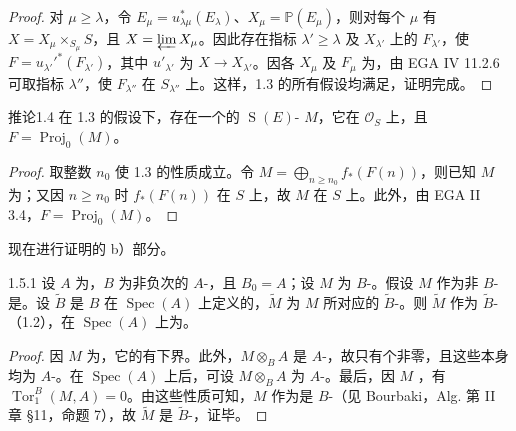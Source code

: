 \begin{proof}
对 $\mu\geq\lambda$，令 $E_\mu=u_{\lambda\mu}^*(E_\lambda)$、$X_\mu=\mathbb P(E_\mu)$，则对每个 $\mu$ 有 $X=X_\mu\times_{S_\mu}S$，且 $X=\varprojlim X_\mu$。因此存在指标 $\lambda'\geq\lambda$
及 $X_{\lambda'}$ 上的 $F_{\lambda'}$，使 $F=u_{\lambda'}'^*(F_{\lambda'})$，其中 $u'_{\lambda'}$ 为 $X\to X_{\lambda'}$。因各 $X_\mu$ 及 $F_\mu$ 为，由 EGA IV 11.2.6 可取指标 $\lambda''$，使 $F_{\lambda''}$ 在 $S_{\lambda''}$ 上。这样，1.3 的所有假设均满足，证明完成。
\end{proof}
\begin{SGAresult}{推论}{1.4}
在 1.3 的假设下，存在一个的 $\operatorname{S}(E)$- $M$，它在 $\mathcal O_S$ 上，且 $F=\operatorname{Proj}_0(M)$。
\end{SGAresult}
\begin{proof}
取整数 $n_0$ 使 1.3 的性质成立。令 $M=\bigoplus_{n\geq n_0}f_*(F(n))$，则已知 $M$ 为；又因 $n\geq n_0$ 时 $f_*(F(n))$ 在 $S$ 上，故 $M$ 在 $S$ 上。此外，由 EGA II 3.4，$F=\operatorname{Proj}_0(M)$。
\end{proof}
现在进行证明的 b）部分。
\begin{SGAresult}{}{1.5.1}
设 $A$ 为，$B$ 为非负次的 $A$-，且 $B_0=A$；设 $M$ 为 $B$-。假设 $M$ 作为非 $B$-是。设 $\widetilde B$ 是 $B$ 在 $\operatorname{Spec}(A)$ 上定义的，$\widetilde M$ 为 $M$ 所对应的 $\widetilde B$-。则 $\widetilde M$ 作为 $\widetilde B$-（1.2），在 $\operatorname{Spec}(A)$ 上为。
\end{SGAresult}
\begin{proof}
因 $M$ 为，它的有下界。此外，$M\otimes_BA$ 是 $A$-，故只有个非零，且这些本身均为 $A$-。在 $\operatorname{Spec}(A)$ 上后，可设 $M\otimes_BA$ 为 $A$-。最后，因 $M$ ，有 $\operatorname{Tor}_1^B(M,A)=0$。由这些性质可知，$M$ 作为是 $B$-（见 Bourbaki，Alg. 第 II 章 §11，命题 7），故 $\widetilde M$ 是 $\widetilde B$-，证毕。
\end{proof}
